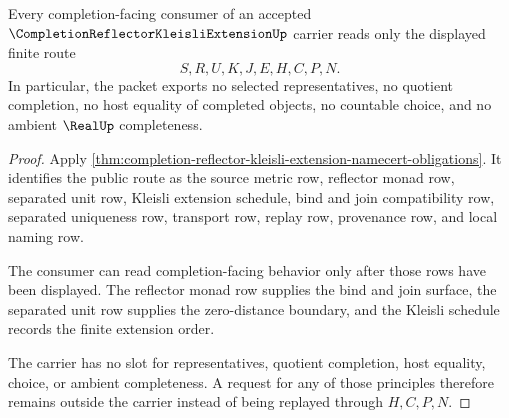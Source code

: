 \begin{theorem}
\label{thm:completion-reflector-kleisli-extension-nonescape}
Every completion-facing consumer of an accepted $\CompletionReflectorKleisliExtensionUp$ carrier reads only the displayed finite route
$$
S,R,U,K,J,E,H,C,P,N .
$$
In particular, the packet exports no selected representatives, no quotient completion, no host equality of completed objects, no countable choice, and no ambient $\RealUp$ completeness.
\end{theorem}
\begin{proof}
Apply \autoref{thm:completion-reflector-kleisli-extension-namecert-obligations}. It identifies the public route as the source metric row, reflector monad row, separated unit row, Kleisli extension schedule, bind and join compatibility row, separated uniqueness row, transport row, replay row, provenance row, and local naming row.

The consumer can read completion-facing behavior only after those rows have been displayed. The reflector monad row supplies the bind and join surface, the separated unit row supplies the zero-distance boundary, and the Kleisli schedule records the finite extension order.

The carrier has no slot for representatives, quotient completion, host equality, choice, or ambient completeness. A request for any of those principles therefore remains outside the carrier instead of being replayed through $H,C,P,N$.
\end{proof}


\begin{closurestatus}{\CompletionReflectorKleisliExtensionUp}
  \theoryclosure{\seedClosure}
  \formalstatus{\unformalizedV}
\end{closurestatus}

